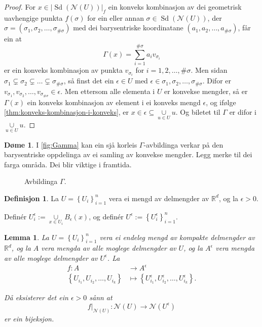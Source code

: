 \documentclass[a4paper, 12pt, norsk]{article}
\theoremstyle{plain}
\newtheorem{lemma}[theorem]{Lemma}
\theoremstyle{definition}
\newtheorem{definition}[theorem]{Definisjon}
\newtheorem{example}[theorem]{Døme}
\newcommand{\Rb}{\mathbb{R}}
\newcommand{\Nc}{\mathcal{N}}
\newcommand{\union}{ \mathop{\cup}\limits }
\newcommand{\gr}[1]{ \lvert #1 \rvert } %
\newcommand{\set}[1]{ \left\{ #1 \right\} } %
\newcommand{\tuple}[1]{ \left( #1 \right) } %
\DeclareMathOperator{\Sd}{Sd} %
\begin{document}
\begin{proof}
	For \( x \in \gr{\Sd(\Nc(U))}_f \) ein konveks kombinasjon av dei geometrisk uavhengige punkta \( f(\sigma) \) for ein eller annan \( \sigma \in \Sd(\Nc(U)) \), der \( \sigma = \tuple{\sigma_1, \sigma_2, \dots, \sigma_{\#\sigma}} \) med dei barysentriske koordinatane \( \tuple{a_1, a_2, \dots, a_{\#\sigma}} \), får ein at
	\[
		\Gamma(x) = \sum_{i=1}^{\#\sigma} a_i v_{\sigma_i}
	\]
	er ein konveks kombinasjon av punkta \( v_{\sigma_i} \) for \( i = 1,2,\dots,\#\sigma \). Men sidan \( \sigma_1 \subsetneq \sigma_2 \subsetneq \dots \subsetneq \sigma_{\#\sigma} \), så finst det ein \( \epsilon \in U \) med \( \epsilon \in \sigma_1, \sigma_2, \dots, \sigma_{\#\sigma} \). Difor er \( v_{\sigma_1}, v_{\sigma_2}, \dots, v_{\sigma_{\#\sigma}} \in \epsilon \). Men ettersom alle elementa i \( U \) er konvekse mengder, så er \( \Gamma(x) \) ein konveks kombinasjon av element i ei konveks mengd \( \epsilon \), og ifølge \autoref{thm:konveks-kombinasjon-i-konveks}, er \( x \in \epsilon \subseteq \union_{u\in U} u \). Og biletet til \( \Gamma \) er difor i \( \union_{u\in U} u \).
\end{proof}

\begin{example}
	I \autoref{fig:Gamma} kan ein sjå korleis \( \Gamma \)-avbildinga verkar på den barysentriske oppdelinga av ei samling av konvekse mengder. Legg merke til dei farga områda. Dei blir viktige i framtida.
	\begin{figure}[htbp]
		\begin{center}
			
		\end{center}
		\caption{Avbildinga \( \Gamma \).}
		\label{fig:Gamma}
	\end{figure}
\end{example}

\begin{definition}
	La \(  U=\set{U_i}_{i=1}^n \) vera ei mengd av delmengder av \( \Rb^d \), og la \( \epsilon > 0 \).
	
	Definér \( U_i^\epsilon := \union_{x \in U_i} B_\epsilon(x) \), og definér \( U^\epsilon := \set{U_i^\epsilon}_{i=1}^n \).
\end{definition}

\begin{lemma} \label{thm:epsilondekke}
	La \( U = \set{U_i}_{i=1}^n \) vera ei endeleg mengd av kompakte delmengder av \( \Rb^d \), og la \( A \) vera mengda av alle moglege delmengder av \( U \), og la \( A^\epsilon \) vera mengda av alle moglege delmengder av \( U^\epsilon \). La
	\begin{align*}
		f: A &\to A^\epsilon \\
		\set{U_{i_1}, U_{i_2}, \dots, U_{i_k}} &\mapsto \set{U_{i_1}^\epsilon, U_{i_2}^\epsilon, \dots, U_{i_k}^\epsilon}.
	\end{align*}
	
	Då eksisterer det ein \( \epsilon > 0 \) sånn at
	\[
		f|_{\Nc(U)}: \Nc(U) \to \Nc(U^\epsilon)
	\]
	er ein bijeksjon.
\end{lemma}
\end{document}
